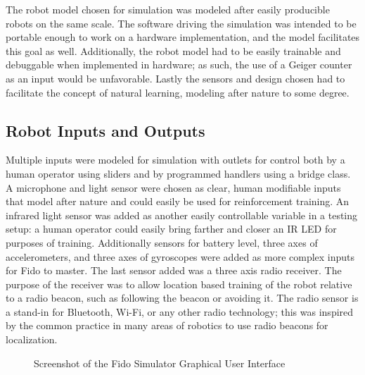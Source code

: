The robot model chosen for simulation was modeled after easily producible robots on the same scale.  The software driving the simulation was intended to be portable enough to work on a hardware implementation, and the model facilitates this goal as well.  Additionally, the robot model had to be easily trainable and debuggable when implemented in hardware; as such, the use of a Geiger counter as an input would be unfavorable.  Lastly the sensors and design chosen had to facilitate the concept of natural learning, modeling after nature to some degree.

\subsection{Robot Inputs and Outputs}

Multiple inputs were modeled for simulation with outlets for control both by a human operator using sliders and by programmed handlers using a bridge class.  A microphone and light sensor were chosen as clear, human modifiable inputs that model after nature and could easily be used for reinforcement training.  An infrared light sensor was added as another easily controllable variable in a testing setup: a human operator could easily bring farther and closer an IR LED for purposes of training.   Additionally sensors for battery level, three axes of accelerometers, and three axes of gyroscopes were added as more complex inputs for Fido to master.  The last sensor added was a three axis radio receiver.  The purpose of the receiver was to allow location based training of the robot relative to a radio beacon, such as following the beacon or avoiding it.  The radio sensor is a stand-in for Bluetooth, Wi-Fi, or any other radio technology; this was inspired by the common practice in many areas of robotics to use radio beacons for localization.

\begin{figure}
	\centering
	\caption{Screenshot of the Fido Simulator Graphical User Interface}
\end{figure}


